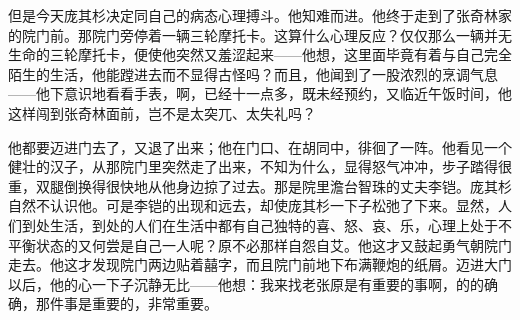 \par 但是今天庞其杉决定同自己的病态心理搏斗。他知难而进。他终于走到了张奇林家的院门前。那院门旁停着一辆三轮摩托卡。这算什么心理反应？仅仅那么一辆并无生命的三轮摩托卡，便使他突然又羞涩起来——他想，这里面毕竟有着与自己完全陌生的生活，他能蹚进去而不显得古怪吗？而且，他闻到了一股浓烈的烹调气息——他下意识地看看手表，啊，已经十一点多，既未经预约，又临近午饭时间，他这样闯到张奇林面前，岂不是太突兀、太失礼吗？
\par 他都要迈进门去了，又退了出来；他在门口、在胡同中，徘徊了一阵。他看见一个健壮的汉子，从那院门里突然走了出来，不知为什么，显得怒气冲冲，步子踏得很重，双腿倒换得很快地从他身边掠了过去。那是院里澹台智珠的丈夫李铠。庞其杉自然不认识他。可是李铠的出现和远去，却使庞其杉一下子松弛了下来。显然，人们到处生活，到处的人们在生活中都有自己独特的喜、怒、哀、乐，心理上处于不平衡状态的又何尝是自己一人呢？原不必那样自怨自艾。他这才又鼓起勇气朝院门走去。他这才发现院门两边贴着囍字，而且院门前地下布满鞭炮的纸屑。迈进大门以后，他的心一下子沉静无比——他想：我来找老张原是有重要的事啊，的的确确，那件事是重要的，非常重要。

